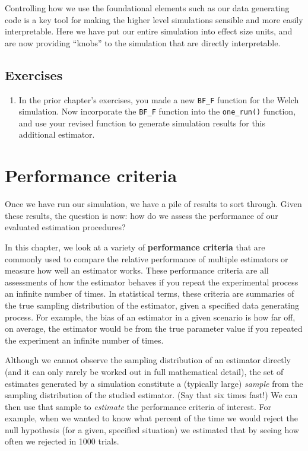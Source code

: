 \documentclass[
]{book}
\providecommand{\tightlist}{%
  \setlength{\itemsep}{0pt}\setlength{\parskip}{0pt}}
\begin{document}
Controlling how we use the foundational elements such as our data generating code is a key tool for making the higher level simulations sensible and more easily interpretable.
Here we have put our entire simulation into effect size units, and are now providing ``knobs'' to the simulation that are directly interpretable.

\section{Exercises}\label{exercises-4}

\begin{enumerate}
\def\labelenumi{\arabic{enumi}.}
\tightlist
\item
  In the prior chapter's exercises, you made a new \texttt{BF\_F} function for the Welch simulation. Now incorporate the \texttt{BF\_F} function into the \texttt{one\_run()} function, and use your revised function to generate simulation results for this additional estimator.
\end{enumerate}

\chapter{Performance criteria}\label{performance-criteria}

Once we have run our simulation, we have a pile of results to sort through.
Given these results, the question is now: how do we assess the performance of our evaluated estimation procedures?

In this chapter, we look at a variety of \textbf{performance criteria} that are commonly used to compare the relative performance of multiple estimators or measure how well an estimator works.
These performance criteria are all assessments of how the estimator behaves if you repeat the experimental process an infinite number of times.
In statistical terms, these criteria are summaries of the true sampling distribution of the estimator, given a specified data generating process.
For example, the bias of an estimator in a given scenario is how far off, on average, the estimator would be from the true parameter value if you repeated the experiment an infinite number of times.

Although we cannot observe the sampling distribution of an estimator directly (and it can only rarely be worked out in full mathematical detail), the set of estimates generated by a simulation constitute a (typically large) \emph{sample} from the sampling distribution of the studied estimator. (Say that six times fast!)
We can then use that sample to \emph{estimate} the performance criteria of interest.
For example, when we wanted to know what percent of the time we would reject the null hypothesis (for a given, specified situation) we estimated that by seeing how often we rejected in 1000 trials.
\end{document}
